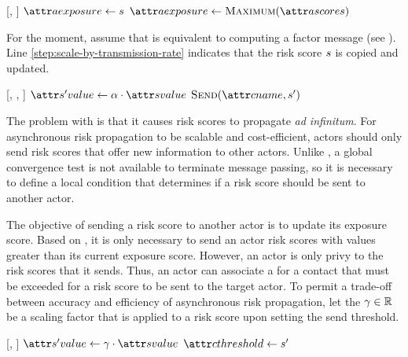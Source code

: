 \begin{function}[H]{\nUpdateExposureScore}[\vActor, \vScore]
  \If{$\aActorExposureValue < \aScoreValue$}
    \State $\aActorExposure \assign \vScore$
    \State $\aActorExposure \assign \cMaximum[\aActorScores]$
  \EndIf
\end{function}

For the moment, assume that \cApplyRiskScore{} is equivalent to computing a factor message (see ). Line \ref{step:scale-by-transmission-rate} indicates that the risk score $s$ is copied and updated.

\begin{function}[H]{\nApplyRiskScore}[\vActor, \vContact, \vScore]
  \If{$\aContactTime + \pTimeBuffer > \aScoreTime$}
    \State $\aNewScoreValue \assign \pTransmissionRate \cdot \aScoreValue$ \label{step:scale-by-transmission-rate}
    \State $\cSend[\aContactName, \vNewScore]$
  \EndIf
\end{function}

The problem with \cApplyRiskScore{} is that it causes risk scores to propagate \textit{ad infinitum}. For asynchronous risk propagation to be scalable and cost-efficient, actors should only send risk scores that offer new information to other actors. Unlike \cRiskPropagation{}, a global convergence test is not available to terminate message passing, so it is necessary to define a local condition that determines if a risk score should be sent to another actor.

The objective of sending a risk score to another actor is to update its exposure score. Based on \cHandleRiskScore{}, it is only necessary to send an actor risk scores with values greater than its current exposure score. However, an actor is only privy to the risk scores that it sends. Thus, an actor can associate a  for a contact that must be exceeded for a risk score to be sent to the target actor. To permit a trade-off between accuracy and efficiency of asynchronous risk propagation, let the  $\gamma \in \mathbb{R}$ be a scaling factor that is applied to a risk score upon setting the send threshold.

\begin{function}{\nSetSendThreshold}[\vContact, \vScore]
  \State $\aNewScoreValue \assign \pSendCoefficient \cdot \aScoreValue$
  \State $\aContactThreshold \assign \vNewScore$
\end{function}

